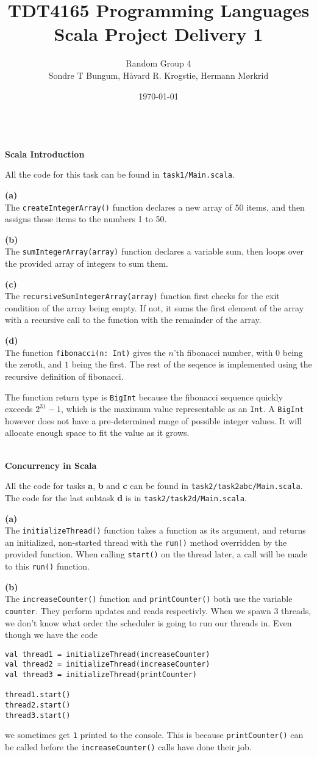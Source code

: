 \documentclass[12pt]{article}
\title{TDT4165 Programming Languages\\Scala Project Delivery 1}
\author{\small{Random Group 4}\\ \small{Sondre T Bungum, Håvard R. Krogstie, Hermann Mørkrid}}
\date{\today}
\newcommand{\task}[1]{\vspace*{5mm}\hspace*{-2cm}\fbox{#1}\\[-5mm]}
\newcommand{\subtask}[1]{\hspace*{-1cm}\textbf{(#1)}\\[-5mm]}
\begin{document}
\maketitle

\task{1}
\textbf{Scala Introduction}

All the code for this task can be found in \verb|task1/Main.scala|.

\subtask{a}
The \verb|createIntegerArray()| function declares a new array of 50 items, and then assigns those items to the numbers 1 to 50.

\subtask{b}
The \verb|sumIntegerArray(array)| function declares a variable sum, then loops over the provided array of integers to sum them.

\subtask{c}
The \verb|recursiveSumIntegerArray(array)| function first checks for the exit condition of the array being empty. If not, it sums the first element of the array with a recursive call to the function with the remainder of the array.

\subtask{d}
The function \verb|fibonacci(n: Int)| gives the $n$'th fibonacci number,
with $0$ being the zeroth, and $1$ being the first. The rest of the seqence
is implemented using the recursive definition of fibonacci.

The function return type is \verb|BigInt| because the fibonacci sequence
quickly exceeds $2^{31}-1$, which is the maximum value representable as an \verb|Int|.
A \verb|BigInt| however does not have a pre-determined range of possible integer values.
It will allocate enough space to fit the value as it grows.

\task{2}
\textbf{Concurrency in Scala}

All the code for tasks \textbf{a}, \textbf{b} and \textbf{c} can be found in \verb|task2/task2abc/Main.scala|.
The code for the last subtask \textbf{d} is in \verb|task2/task2d/Main.scala|.

\subtask{a}
The \verb|initializeThread()| function takes a function as its argument, and returns an initialized, non-started thread with the \verb|run()| method overridden by the provided function. When calling \verb|start()| on the thread later, a call will be made to this \verb|run()| function.

\subtask{b}
The \verb|increaseCounter()| function and \verb|printCounter()| both use the variable \verb|counter|.
They perform updates and reads respectivly. When we spawn 3 threads, we don't know what order
the scheduler is going to run our threads in. Even though we have the code
%
\begin{verbatim}
val thread1 = initializeThread(increaseCounter)
val thread2 = initializeThread(increaseCounter)
val thread3 = initializeThread(printCounter)

thread1.start()
thread2.start()
thread3.start()
\end{verbatim}
%
we sometimes get \verb|1| printed to the console. This is because \verb|printCounter()|
can be called before the \verb|increaseCounter()| calls have done their job.
\end{document}
